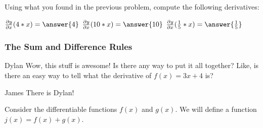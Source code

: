 \documentclass{ximera}
\begin{document}
\begin{question}
\item{Using what you found in the previous problem, compute the following derivatives:}

$ \frac{\partial y}{\partial x} (4*x) =  \answer{4}$
$ \frac{\partial y}{\partial x} (10*x) =  \answer{10}$
$ \frac{\partial y}{\partial x} (\frac{1}{5}*x) =  \answer{\frac{1}{5}}$
\end{question}

\subsubsection{The Sum and Difference Rules}
\begin{dialogue}
\item[Dylan] Wow, this stuff is awesome! Is there any way to put it all together? Like, is there an easy way to tell what the derivative of $f(x) = 3x+4$ is?
\item[James] There is Dylan!
\end{dialogue}
Consider the differentiable functions $f(x)$ and $g(x)$. We will define a function $j(x) = f(x) + g(x)$.
\end{document}
